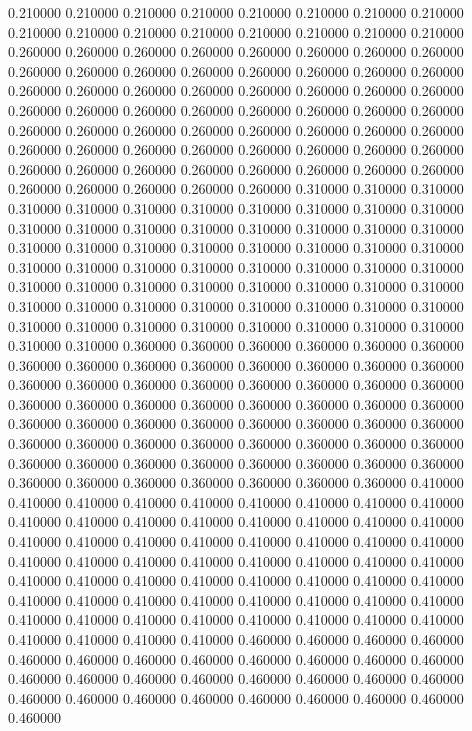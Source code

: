 0.210000
0.210000
0.210000
0.210000
0.210000
0.210000
0.210000
0.210000
0.210000
0.210000
0.210000
0.210000
0.210000
0.210000
0.210000
0.210000
0.260000
0.260000
0.260000
0.260000
0.260000
0.260000
0.260000
0.260000
0.260000
0.260000
0.260000
0.260000
0.260000
0.260000
0.260000
0.260000
0.260000
0.260000
0.260000
0.260000
0.260000
0.260000
0.260000
0.260000
0.260000
0.260000
0.260000
0.260000
0.260000
0.260000
0.260000
0.260000
0.260000
0.260000
0.260000
0.260000
0.260000
0.260000
0.260000
0.260000
0.260000
0.260000
0.260000
0.260000
0.260000
0.260000
0.260000
0.260000
0.260000
0.260000
0.260000
0.260000
0.260000
0.260000
0.260000
0.260000
0.260000
0.260000
0.260000
0.260000
0.260000
0.310000
0.310000
0.310000
0.310000
0.310000
0.310000
0.310000
0.310000
0.310000
0.310000
0.310000
0.310000
0.310000
0.310000
0.310000
0.310000
0.310000
0.310000
0.310000
0.310000
0.310000
0.310000
0.310000
0.310000
0.310000
0.310000
0.310000
0.310000
0.310000
0.310000
0.310000
0.310000
0.310000
0.310000
0.310000
0.310000
0.310000
0.310000
0.310000
0.310000
0.310000
0.310000
0.310000
0.310000
0.310000
0.310000
0.310000
0.310000
0.310000
0.310000
0.310000
0.310000
0.310000
0.310000
0.310000
0.310000
0.310000
0.310000
0.310000
0.310000
0.310000
0.360000
0.360000
0.360000
0.360000
0.360000
0.360000
0.360000
0.360000
0.360000
0.360000
0.360000
0.360000
0.360000
0.360000
0.360000
0.360000
0.360000
0.360000
0.360000
0.360000
0.360000
0.360000
0.360000
0.360000
0.360000
0.360000
0.360000
0.360000
0.360000
0.360000
0.360000
0.360000
0.360000
0.360000
0.360000
0.360000
0.360000
0.360000
0.360000
0.360000
0.360000
0.360000
0.360000
0.360000
0.360000
0.360000
0.360000
0.360000
0.360000
0.360000
0.360000
0.360000
0.360000
0.360000
0.360000
0.360000
0.360000
0.360000
0.360000
0.360000
0.360000
0.410000
0.410000
0.410000
0.410000
0.410000
0.410000
0.410000
0.410000
0.410000
0.410000
0.410000
0.410000
0.410000
0.410000
0.410000
0.410000
0.410000
0.410000
0.410000
0.410000
0.410000
0.410000
0.410000
0.410000
0.410000
0.410000
0.410000
0.410000
0.410000
0.410000
0.410000
0.410000
0.410000
0.410000
0.410000
0.410000
0.410000
0.410000
0.410000
0.410000
0.410000
0.410000
0.410000
0.410000
0.410000
0.410000
0.410000
0.410000
0.410000
0.410000
0.410000
0.410000
0.410000
0.410000
0.410000
0.410000
0.410000
0.410000
0.410000
0.410000
0.410000
0.460000
0.460000
0.460000
0.460000
0.460000
0.460000
0.460000
0.460000
0.460000
0.460000
0.460000
0.460000
0.460000
0.460000
0.460000
0.460000
0.460000
0.460000
0.460000
0.460000
0.460000
0.460000
0.460000
0.460000
0.460000
0.460000
0.460000
0.460000
0.460000
